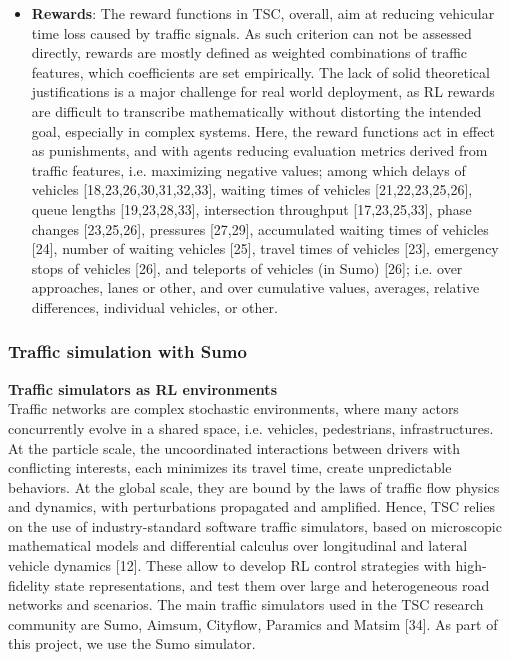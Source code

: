 \begin{itemize}
  \item \textbf{Rewards}: The reward functions in TSC, overall, aim at reducing vehicular time loss caused by traffic signals. As such criterion can not be assessed directly, rewards are mostly defined as weighted combinations of traffic features, which coefficients are set empirically. The lack of solid theoretical justifications is a major challenge for real world deployment, as RL rewards are difficult to transcribe mathematically without distorting the intended goal, especially in complex systems. Here, the reward functions act in effect as punishments, and with agents reducing evaluation metrics derived from traffic features, i.e. maximizing negative values; among which delays of vehicles [18,23,26,30,31,32,33], waiting times of vehicles [21,22,23,25,26], queue lengths [19,23,28,33], intersection throughput [17,23,25,33], phase changes [23,25,26], pressures [27,29], accumulated waiting times of vehicles [24], number of waiting vehicles [25], travel times of vehicles [23], emergency stops  of vehicles [26], and teleports of vehicles (in Sumo) [26]; i.e. over approaches, lanes or other, and over cumulative values, averages, relative differences, individual vehicles, or other. 
\end{itemize}

\pagebreak


\subsubsection{Traffic simulation with Sumo}

\textbf{Traffic simulators as RL environments} \\
Traffic networks are complex stochastic environments, where many actors concurrently evolve in a shared space, i.e. vehicles, pedestrians, infrastructures. At the particle scale, the uncoordinated interactions between drivers with conflicting interests, each minimizes its travel time, create unpredictable behaviors. At the global scale, they are bound by the laws of traffic flow physics and dynamics, with perturbations propagated and amplified. Hence, TSC relies on the use of industry-standard software traffic simulators, based on microscopic mathematical models and differential calculus over longitudinal and lateral vehicle dynamics [12]. These allow to develop RL control strategies with high-fidelity state representations, and test them over large and heterogeneous road networks and scenarios. The main traffic simulators used in the TSC research community are Sumo, Aimsum, Cityflow, Paramics and Matsim [34]. As part of this project, we use the Sumo simulator. \\


